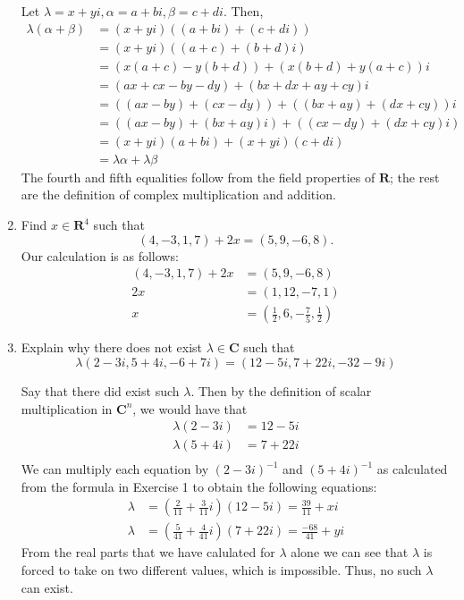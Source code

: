 \documentclass{book}
\begin{document}
\begin{enumerate}
Let \(\lambda=x+yi,\alpha=a+bi,\beta=c+di\).  Then,
\begin{equation*}
\begin{split}
\lambda(\alpha+\beta) &= (x+yi)((a+bi)+(c+di)) \\
&=(x+yi)((a+c)+(b+d)i) \\
&= (x(a+c)-y(b+d))+(x(b+d)+y(a+c))i \\
&= (ax+cx-by-dy)+(bx+dx+ay+cy)i \\
&= ((ax-by)+(cx-dy))+((bx+ay)+(dx+cy))i \\
&= ((ax-by)+(bx+ay)i)+((cx-dy)+(dx+cy)i) \\
&= (x+yi)(a+bi)+(x+yi)(c+di) \\
&= \lambda\alpha+\lambda\beta
\end{split}
\end{equation*}
The fourth and fifth equalities follow from the field properties of \(\textbf{R}\); the rest are the definition of complex multiplication and addition.

\item Find \(x \in \textbf{R}^4\) such that \[(4,-3,1,7)+2x=(5,9,-6,8).\]
Our calculation is as follows:
\begin{align*}
(4,-3,1,7)+2x &= (5,9,-6,8) \\
2x &= (1,12,-7,1) \\
x &= (\frac{1}{2},6,-\frac{7}{5},\frac{1}{2})
\end{align*}

\item Explain why there does not exist \(\lambda \in \textbf{C}\) such that \[\lambda(2-3i,5+4i,-6+7i)=(12-5i,7+22i,-32-9i)\]

Say that there did exist such \(\lambda\).  Then by the definition of scalar multiplication in \(\textbf{C}^n\), we would have that
\begin{align*}
\lambda(2-3i) &= 12-5i \\
\lambda(5+4i) &= 7+22i \\
\end{align*}
We can multiply each equation by \((2-3i)^{-1}\) and \((5+4i)^{-1}\) as calculated from the formula in Exercise 1 to obtain the following equations:
\begin{align*}
\lambda &= (\frac{2}{11}+\frac{3}{11}i)(12-5i) = \frac{39}{11}+xi \\
\lambda &= (\frac{5}{41}+\frac{4}{41}i)(7+22i) = \frac{-68}{41}+yi
\end{align*}
From the real parts that we have calulated for \(\lambda\) alone we can see that \(\lambda\) is forced to take on two different values, which is impossible.  Thus, no such \(\lambda\) can exist.


\end{enumerate}
\end{document}
